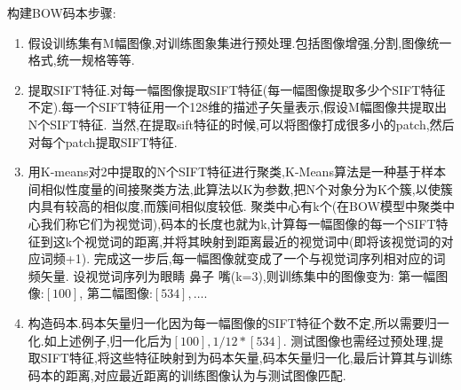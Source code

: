 构建BOW码本步骤:
\begin{enumerate}
\item 假设训练集有M幅图像,对训练图象集进行预处理.包括图像增强,分割,图像统一格式,统一规格等等.
\item 提取SIFT特征.对每一幅图像提取SIFT特征(每一幅图像提取多少个SIFT特征不定).每一个SIFT特征用一个128维的描述子矢量表示,假设M幅图像共提取出N个SIFT特征.
	当然,在提取sift特征的时候,可以将图像打成很多小的patch,然后对每个patch提取SIFT特征.
\item 用K-means对2中提取的N个SIFT特征进行聚类,K-Means算法是一种基于样本间相似性度量的间接聚类方法,此算法以K为参数,把N个对象分为K个簇,以使簇内具有较高的相似度,而簇间相似度较低.
	聚类中心有k个(在BOW模型中聚类中心我们称它们为视觉词),码本的长度也就为k,计算每一幅图像的每一个SIFT特征到这k个视觉词的距离,并将其映射到距离最近的视觉词中(即将该视觉词的对应词频+1).
	完成这一步后,每一幅图像就变成了一个与视觉词序列相对应的词频矢量.
	设视觉词序列为{眼睛 鼻子 嘴}(k=3),则训练集中的图像变为: 第一幅图像:$[1 0 0]$, 第二幅图像:$[5 3 4], \ldots$.
\item 构造码本.码本矢量归一化因为每一幅图像的SIFT特征个数不定,所以需要归一化.如上述例子,归一化后为$[1 0 0], 1/12*[5 3 4]$.
	测试图像也需经过预处理,提取SIFT特征,将这些特征映射到为码本矢量,码本矢量归一化,最后计算其与训练码本的距离,对应最近距离的训练图像认为与测试图像匹配.
\end{enumerate}

